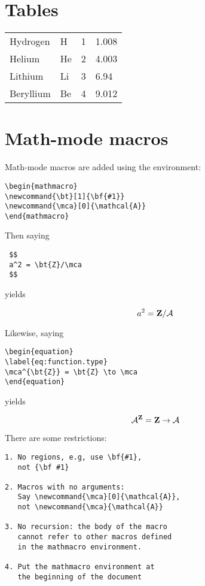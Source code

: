 \section{Tables}

\begin{indent}
\begin{tabular}{ l l l l }
Hydrogen & H & 1 & 1.008 \\
Helium & He & 2 & 4.003 \\
Lithium& Li & 3 & 6.94 \\
Beryllium& Be& 4& 9.012 \\
\end{tabular}
\end{indent}

\section{Math-mode macros}

Math-mode macros are added using the  environment:

\begin{verbatim}
\begin{mathmacro}
\newcommand{\bt}[1]{\bf{#1}}
\newcommand{\mca}[0]{\mathcal{A}}
\end{mathmacro}
\end{verbatim}

Then saying

\begin{verbatim}
 $$
 a^2 = \bt{Z}/\mca
 $$
\end{verbatim}

yields

$$
a^2 = \bt{Z}/\mca
$$

Likewise, saying

\begin{verbatim}
\begin{equation}
\label{eq:function.type}
\mca^{\bt{Z}} = \bt{Z} \to \mca
\end{equation}
\end{verbatim}

yields

\begin{equation}
\label{eq:function.type}
\mca^{\bt{Z}} = \bt{Z} \to \mca
\end{equation}

There are some restrictions:

\begin{verbatim}
1. No regions, e.g, use \bf{#1},
   not {\bf #1}

2. Macros with no arguments:
   Say \newcommand{\mca}[0]{\mathcal{A}},
   not \newcommand{\mca}{\mathcal{A}}

3. No recursion: the body of the macro
   cannot refer to other macros defined
   in the mathmacro environment.

4. Put the mathmacro environment at
   the beginning of the document
\end{verbatim}

